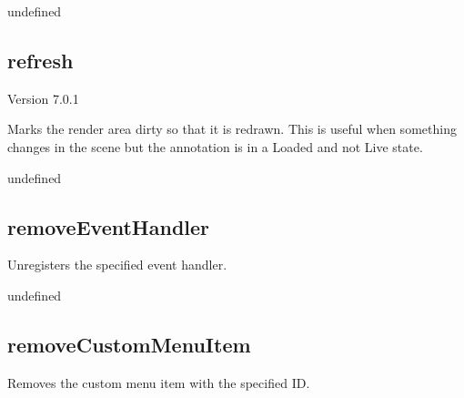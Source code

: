 \documentclass[letterpaper,12pt,english,openany,oneside]{sphinxmanual}
\begin{document}
undefined


\subsection{refresh}
\label{\detokenize{JS_3D_API:refresh}}
Version 7.0.1

Marks the render area dirty so that it is redrawn. This is useful when something changes in the scene but the annotation is in a Loaded and not Live state.

\label{\detokenize{JS_3D_API:syntax-92}}

\begin{sphinxVerbatim}[commandchars=\\\{\}]
\end{sphinxVerbatim}
\label{\detokenize{JS_3D_API:returns-93}}

undefined


\subsection{removeEventHandler}
\label{\detokenize{JS_3D_API:removeeventhandler}}
Unregisters the specified event handler.

\label{\detokenize{JS_3D_API:syntax-93}}

\begin{sphinxVerbatim}[commandchars=\\\{\}]
\end{sphinxVerbatim}
\label{\detokenize{JS_3D_API:parameters-67}}

\label{\detokenize{JS_3D_API:section-95}}\label{\detokenize{JS_3D_API:returns-94}}

undefined


\subsection{removeCustomMenuItem}
\label{\detokenize{JS_3D_API:removecustommenuitem}}
Removes the custom menu item with the specified ID.

\label{\detokenize{JS_3D_API:syntax-94}}

\begin{sphinxVerbatim}[commandchars=\\\{\}]
\end{sphinxVerbatim}
\label{\detokenize{JS_3D_API:parameters-68}}
\end{document}
